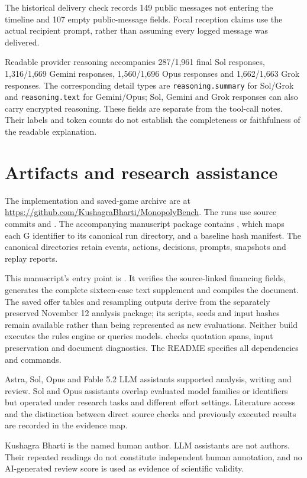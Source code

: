 The historical delivery check records 149 public messages not entering the timeline and 107 empty public-message fields. Focal reception claims use the actual recipient prompt, rather than assuming every logged message was delivered.

Readable provider reasoning accompanies 287/1,961 final Sol responses, 1,316/1,669 Gemini responses, 1,560/1,696 Opus responses and 1,662/1,663 Grok responses. The corresponding detail types are \texttt{reasoning.summary} for Sol/Grok and \texttt{reasoning.text} for Gemini/Opus; Sol, Gemini and Grok responses can also carry encrypted reasoning. These fields are separate from the tool-call notes. Their labels and token counts do not establish the completeness or faithfulness of the readable explanation.

\section{Artifacts and research assistance}
\label{app:artifacts}\label{app:provenance}
The implementation and saved-game archive are at \url{https://github.com/KushagraBharti/MonopolyBench}. The runs use source commits  and . The accompanying manuscript package contains , which maps each G identifier to its canonical run directory, and a baseline hash manifest. The canonical directories retain events, actions, decisions, prompts, snapshots and replay reports.



This manuscript's entry point is . It verifies the source-linked financing fields, generates the complete sixteen-case text supplement and compiles the document. The saved offer tables and resampling outputs derive from the separately preserved November 12 analysis package; its scripts, seeds and input hashes remain available rather than being represented as new evaluations. Neither build executes the rules engine or queries models.  checks quotation spans, input preservation and document diagnostics. The README specifies all dependencies and commands.

Astra, Sol, Opus and Fable 5.2 LLM assistants supported analysis, writing and review. Sol and Opus assistants overlap evaluated model families or identifiers but operated under research tasks and different effort settings. Literature access and the distinction between direct source checks and previously executed results are recorded in the evidence map.

Kushagra Bharti is the named human author. LLM assistants are not authors. Their repeated readings do not constitute independent human annotation, and no AI-generated review score is used as evidence of scientific validity.
